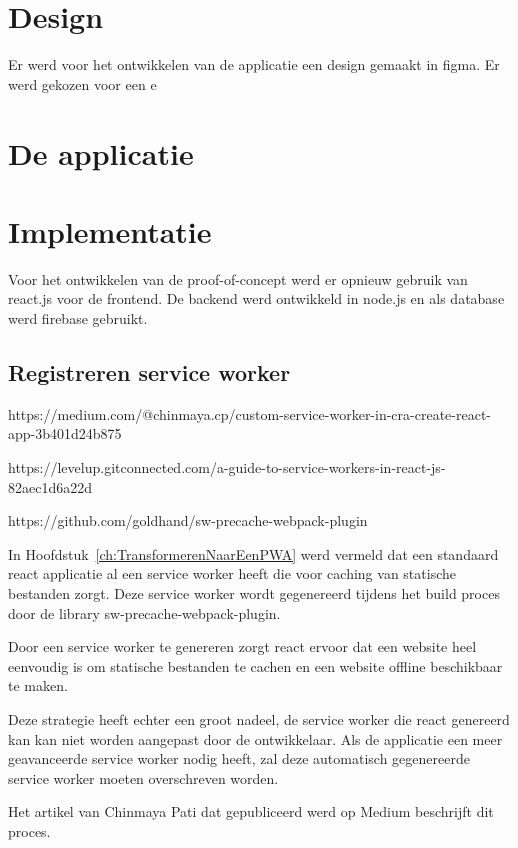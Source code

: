 		
\section{Design} 

	Er werd voor het ontwikkelen van de applicatie een design gemaakt in figma. Er werd gekozen voor een e
	
	
\section{De applicatie}


\section{Implementatie}
	
	Voor het ontwikkelen van de proof-of-concept werd er opnieuw gebruik van react.js voor de frontend. De backend werd ontwikkeld in node.js en als database werd firebase gebruikt.
	
	\subsection{Registreren service worker}
		https://medium.com/@chinmaya.cp/custom-service-worker-in-cra-create-react-app-3b401d24b875
		
		https://levelup.gitconnected.com/a-guide-to-service-workers-in-react-js-82aec1d6a22d
		
		https://github.com/goldhand/sw-precache-webpack-plugin
		
		In Hoofdstuk~\ref{ch:TransformerenNaarEenPWA} werd vermeld dat een standaard react applicatie al een service worker heeft die voor caching van statische bestanden zorgt. Deze service worker wordt gegenereerd tijdens het build proces door de library sw-precache-webpack-plugin. 
		
		Door een service worker te genereren zorgt react ervoor dat een website heel eenvoudig is om statische bestanden te cachen en een website offline beschikbaar te maken.
		
		Deze strategie heeft echter een groot nadeel, de service worker die react genereerd kan kan niet worden aangepast door de ontwikkelaar. Als de applicatie een meer geavanceerde service worker nodig heeft, zal deze automatisch gegenereerde service worker moeten overschreven worden.
		
		Het artikel van Chinmaya Pati dat gepubliceerd werd op Medium beschrijft dit proces.
		
